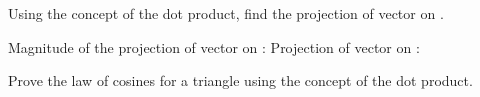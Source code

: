 
\begin{ELexample}{}

Using the concept of the dot product, find the projection of vector  on .


\begin{ELsolution}


Magnitude of the projection of vector  on :
Projection of vector  on :

\end{ELsolution}

\end{ELexample}


\begin{ELexample}{}

Prove the law of cosines for a triangle using the concept of the dot product.


\begin{ELsolution}



\end{ELsolution}

\end{ELexample}

\ELhold


